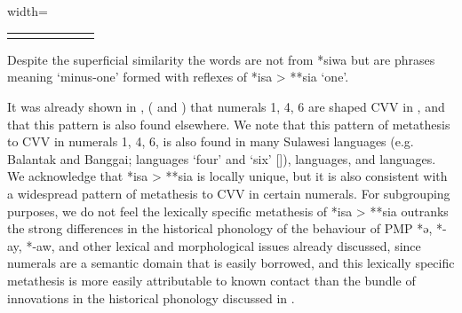 \begin{table}
\begin{adjustbox}{width=\textwidth}
\begin{threeparttable}
\begin{tabular}{lllllll}
		\lspbottomrule
	\end{tabular} 
		\begin{tablenotes}\tnsize
			\item[†]	{Despite the superficial similarity the
								words are not from *siwa but are phrases meaning
								‘minus-one’ formed with reflexes
								of *isa > **sia ‘one’.}
		\end{tablenotes}
	\end{threeparttable}
\end{adjustbox}
\end{table}

It was already shown in ,
( and ) that numerals 1,
4, 6 are shaped CVV in ,
and that this pattern is also found elsewhere.
We note that this pattern of metathesis to CVV in numerals 1,
4, 6, is also found in many Sulawesi languages (e.g.
Balantak and Banggai;  languages ‘four’
and ‘six’ [\citealp[156f]{Mead1999}]),
 languages, and  languages.
We acknowledge that *isa > **sia is locally unique,
but it is also consistent with a widespread pattern of metathesis
to CVV in certain numerals.
For subgrouping purposes, we do not feel the lexically specific
metathesis of *isa > **sia outranks the strong differences in
the historical phonology of the behaviour of PMP *ə,
*-ay, *-aw, and other lexical
and morphological issues already discussed,
since numerals are a semantic domain that is easily borrowed,
and this lexically specific metathesis is more easily attributable
to known contact than the bundle of innovations in the historical
phonology discussed in .

